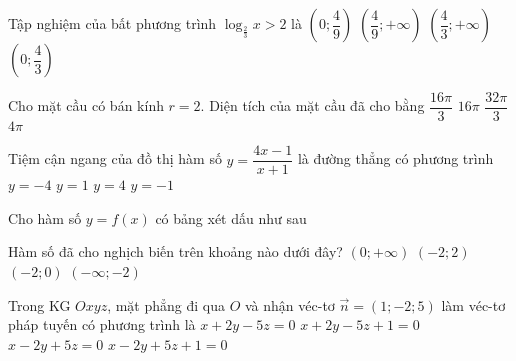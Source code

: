 \begin{ex}%
	Tập nghiệm của bất phương trình $\log _{\frac{2}{3}}x>2$ là
	\choice
	{\True $\left(0 ; \dfrac{4}{9}\right)$}
	{$\left(\dfrac{4}{9};+\infty\right)$}
	{$\left(\dfrac{4}{3};+\infty\right)$}
	{$\left(0 ; \dfrac{4}{3}\right)$}
\end{ex}
\begin{ex}%
	Cho mặt cầu có bán kính $r=2$. Diện tích của mặt cầu đã cho bằng
	\choice
	{$\dfrac{16 \pi}{3}$}
	{\True $16 \pi$}
	{$\dfrac{32 \pi}{3}$}
	{$4 \pi$}
\end{ex}
\begin{ex}%
	Tiệm cận ngang của đồ thị hàm số $y=\dfrac{4 x-1}{x+1}$ là đường thẳng có phương trình
	\choice
	{$y=-4$}
	{$y=1$}
	{\True $y=4$}
	{$y=-1$}
\end{ex}
\begin{ex}%
	Cho hàm số $y=f(x)$ có bảng xét dấu như sau
	\begin{center}
	\end{center}
	Hàm số đã cho nghịch biến trên khoảng nào dưới đây?
	\choice
	{$(0;+\infty)$}
	{$(-2;2)$}
	{\True $(-2;0)$}
	{$(-\infty;-2)$}
\end{ex}

\begin{ex}%
	Trong KG $Oxyz$, mặt phẳng đi qua $O$ và nhận véc-tơ $\vec{n}=(1;-2;5)$ làm véc-tơ pháp tuyến có phương trình là
	\choice
	{$x+2y-5z=0$}
	{$x+2y-5z+1=0$}
	{\True $x-2y+5z=0$}
	{$x-2y+5z+1=0$}
\end{ex}

